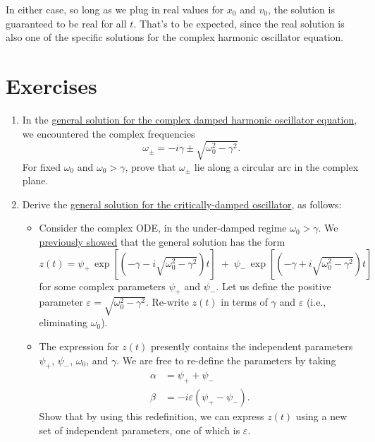 \documentclass[10pt,a4paper]{article}
\begin{document}
In either case, so long as we plug in real values for $x_0$ and $v_0$,
the solution is guaranteed to be real for all $t$. That's to be
expected, since the real solution is also one of the specific
solutions for the complex harmonic oscillator equation.

\section{Exercises}\label{exercises}

\begin{enumerate}
\item
In the \hyperref[general-solution]{general solution for the complex
  damped harmonic oscillator equation}, we encountered the complex
frequencies
\begin{equation}
\omega_\pm = -i\gamma \pm \sqrt{\omega_0^2 - \gamma^2}.
\end{equation}For
fixed $\omega_0$ and $\omega_0 > \gamma$, prove that $\omega_\pm$ lie
along a circular arc in the complex plane.

\item
Derive the \hyperref[critical-damping]{general solution for the
  critically-damped oscillator}, as follows:

\begin{itemize}
\item Consider the complex ODE, in the under-damped regime $\omega_0 >
  \gamma$. We \hyperref[general-solution]{previously showed} that the
  general solution has the form
\begin{equation}
z(t) = \psi_+ \, \exp\left[\left(-\gamma  - i \sqrt{\omega_0^2 - \gamma^2}\right)t\right] \; +\; \psi_- \, \exp\left[\left(-\gamma +i\sqrt{\omega_0^2 - \gamma^2}\right)t\right]
\end{equation}
for some complex parameters $\psi_+$ and $\psi_-$. Let us define the
positive parameter $\varepsilon = \sqrt{\omega_0^2 - \gamma^2}$.
Re-write $z(t)$ in terms of $\gamma$ and $\varepsilon$ (i.e.,
eliminating $\omega_0$).

\item
The expression for $z(t)$ presently contains the independent
parameters $\psi_+$, $\psi_-$, $\omega_0$, and $\gamma$. We are free
to re-define the parameters by taking
\begin{align}
  \alpha &= \psi_+ + \psi_- \\ \beta &= -i\varepsilon(\psi_+ - \psi_-).
\end{align}
Show that by using this redefinition, we can express $z(t)$ using a
new set of independent parameters, one of which is $\varepsilon$.


\end{itemize}
\end{enumerate}
\end{document}
